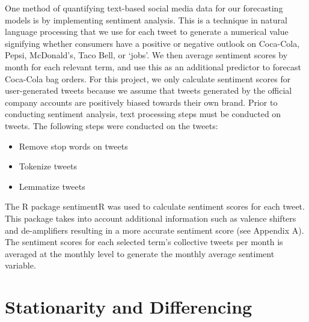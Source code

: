 \documentclass[12pt,oneside]{chicagocapstone}
\providecommand{\tightlist}{%
  \setlength{\itemsep}{0pt}\setlength{\parskip}{0pt}}
\begin{document}
One method of quantifying text-based social media data for our forecasting models is by implementing sentiment analysis. This is a technique in natural language processing that we use for each tweet to generate a numerical value signifying whether consumers have a positive or negative outlook on Coca-Cola, Pepsi, McDonald's, Taco Bell, or `jobs'. We then average sentiment scores by month for each relevant term, and use this as an additional predictor to forecast Coca-Cola bag orders. For this project, we only calculate sentiment scores for user-generated tweets because we assume that tweets generated by the official company accounts are positively biased towards their own brand. Prior to conducting sentiment analysis, text processing steps must be conducted on tweets. The following steps were conducted on the tweets:
\begin{itemize}
\tightlist
\item
  Remove stop words on tweets
\item
  Tokenize tweets
\item
  Lemmatize tweets
\end{itemize}
The R package sentimentR was used to calculate sentiment scores for each tweet. This package takes into account additional information such as valence shifters and de-amplifiers resulting in a more accurate sentiment score (see Appendix A). The sentiment scores for each selected term's collective tweets per month is averaged at the monthly level to generate the monthly average sentiment variable.

\hypertarget{stationarity-and-differencing}{%
\section*{Stationarity and Differencing}\label{stationarity-and-differencing}}
\end{document}
